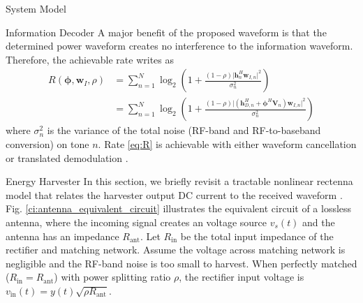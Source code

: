 \documentclass{IEEEtran}
\begin{document}
\begin{section}{System Model}
	\begin{subsection}{Information Decoder}
		A major benefit of the proposed waveform is that the determined power waveform creates no interference to the information waveform. Therefore, the achievable rate writes as
		\begin{equation}\label{eq:R}
			\begin{split}
				R(\boldsymbol{\phi},\boldsymbol{w}_I,\rho)
				& = \sum_{n=1}^N{\log_2\left(1+\frac{(1-\rho)\lvert \boldsymbol{h}_{n}^H\boldsymbol{w}_{I,n} \rvert^2}{\sigma_n^2}\right)}\\
				& = \sum_{n=1}^N{\log_2\left(1+\frac{(1-\rho)\lvert(\boldsymbol{h}_{D,n}^H+\boldsymbol{\phi}^H\boldsymbol{V}_n)\boldsymbol{w}_{I,n}\rvert^2}{\sigma_n^2}\right)}
			\end{split}
		\end{equation}
		where $\sigma_n^2$ is the variance of the total noise (RF-band and RF-to-baseband conversion) on tone $n$. Rate \ref{eq:R} is achievable with either waveform cancellation or translated demodulation \cite{Clerckx2018b}.
	\end{subsection}

	\begin{subsection}{Energy Harvester}
		In this section, we briefly revisit a tractable nonlinear rectenna model that relates the harvester output DC current to the received waveform \cite{Clerckx2016a,Clerckx2018b}. Fig. \ref{ci:antenna_equivalent_circuit} illustrates the equivalent circuit of a lossless antenna, where the incoming signal creates an voltage source $v_s(t)$ and the antenna has an impedance $R_{\text{ant}}$. Let $R_{\text{in}}$ be the total input impedance of the rectifier and matching network. Assume the voltage across matching network is negligible and the RF-band noise is too small to harvest. When perfectly matched ($R_{\text{in}}=R_{\text{ant}}$) with power splitting ratio $\rho$, the rectifier input voltage is $v_{\text{in}}(t)=y(t)\sqrt{\rho R_{\text{ant}}}$.


\end{subsection}
\end{section}
\end{document}
